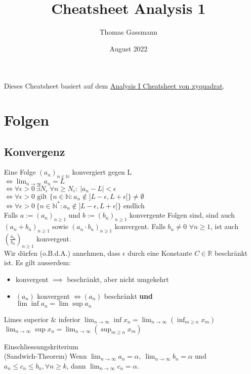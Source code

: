 \documentclass[a4paper,10pt]{article}
\title{Cheatsheet Analysis 1}
\author{Thomas Gassmann}
\date{August 2022}
\def\limn{\lim_{n\to \infty}}
\def\R{\mathbb{R}}
\begin{document}


Dieses Cheatsheet basiert auf dem \href{https://github.com/XYQuadrat/eth-cheatsheets}{Analysis I Cheatsheet von xyquadrat}.

\section{Folgen}
\subsection{Konvergenz}
Eine Folge $(a_n)_{n\in \mathbb{N}}$ konvergiert gegen L \\
 $\iff \lim_{n \to \infty} a_n = L$ \\ 
 $\iff \forall \epsilon > 0 \ \exists N_\epsilon \ \forall n \ge N_\epsilon : \ | a_n - L | < \epsilon$\\
 $\iff \forall \epsilon > 0\text{ gilt }\{ n\in\mathbb{N}:a_n\notin ]L-\epsilon,L+\epsilon[ \} \neq \emptyset $\\
 $\iff \forall \epsilon > 0 \ \{ n \in \mathbb{N}^* : a_n \notin ]L - \epsilon, L + \epsilon[ \}$ endlich\\

Falls $a := (a_n)_{n \geq 1}$ und $b := (b_n)_{n \geq 1}$ konvergente Folgen sind, sind auch $(a_n + b_n)_{n \geq 1}$ sowie $(a_n \cdot b_n)_{n \geq 1}$ konvergent. Falls $b_n \neq 0$ $\forall n \geq 1$, ist auch $(\frac{a_n}{b_n})_{n \geq 1}$ konvergent.\\

Wir dürfen (o.B.d.A.) annehmen, dass $\epsilon$ durch eine Konstante $C \in \R$ beschränkt ist.
Es gilt ausserdem:
\begin{itemize}
 \item konvergent $\implies$ beschränkt, aber nicht umgekehrt
 \item $(a_n)$ konvergent $\iff (a_n)$ beschränkt \textbf{und} \\$\lim \inf a_n = \lim \sup a_n$
\end{itemize}


\begin{subbox}{Limes superior \& inferior}
$\limn \inf x_n = \limn \left( \inf_{m \ge n} x_m \right)$ \\
$\limn \sup x_n = \limn \left( \sup_{m \ge n} x_m \right)$
\end{subbox}

\begin{mainbox}{Einschliessungskriterium \\ (Sandwich-Theorem)}
Wenn $\limn a_n = \alpha, \ \limn b_n = \alpha$ und $a_n \le c_n \le b_n, \forall n \ge k$, dann $\limn c_n = \alpha$.
\end{mainbox}
\end{document}
